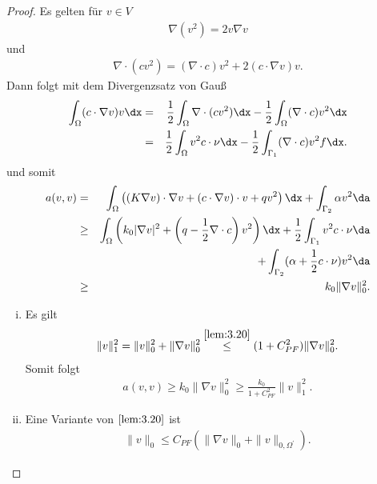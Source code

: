 \begin{proof}
    Es gelten für $v \in V$
    \begin{eqnarray*}
        \nabla(v^2) = 2 v \nabla v
    \end{eqnarray*}
    und
    \begin{eqnarray*}
        \nabla \cdot (c v^2) = (\nabla \cdot c) v^2 + 2 (c \cdot \nabla v) v.
    \end{eqnarray*}
    Dann folgt mit dem Divergenzsatz von Gauß
    \begin{eqnarray*}
            \int_\Omega (c \cdot \nabla v) v \dx
        &=& \frac{1}{2} \int_\Omega \nabla \cdot (c v^2) \dx
            - \frac{1}{2} \int_\Omega (\nabla \cdot c) v^2 \dx \\
        &=& \frac{1}{2} \int_\Omega v^2 c \cdot \nu \dx
            - \frac{1}{2} \int_{\Gamma_1} (\nabla \cdot c) v^2f \dx.
    \end{eqnarray*}
    und somit
    \begin{eqnarray*}
            a(v, v)
        &=& \int_\Omega \left((K \nabla v) \cdot \nabla v
            + (c \cdot \nabla v) \cdot v + q v^2\right) \dx
            + \int_{\Gamma_2} \alpha v^2 \da \\
        &\ge& \int_\Omega \left(k_0 |\nabla v|^2 + \left(q - \frac{1}{2} \nabla
              \cdot c\right) v^2\right) \dx + \frac{1}{2} \int_{\Gamma_1} v^2 c
              \cdot \nu \da \\
              &&+ \int_{\Gamma_2} (\alpha + \frac{1}{2} c \cdot \nu) v^2 \da \\
        &\ge& k_0 \|\nabla v\|_0^2.
    \end{eqnarray*}
    \begin{enumerate}[i)]
      \item
        Es gilt
        \begin{eqnarray*}
              \|v\|_1^2        
            = \|v\|_0^2 + \|\nabla v\|_0^2
            \stackrel{\eqref{lem:3.20}}{\le} (1 + C_{PF}^2) \|\nabla v\|_0^2. 
        \end{eqnarray*}
        Somit folgt
        \begin{eqnarray*}
                a(v, v)
            \ge k_0 \|\nabla v\|_0^2
            \ge \frac{k_0}{1 + C_{PF}^2} \|v\|_1^2.
        \end{eqnarray*}
      \item
        Eine Variante von $\eqref{lem:3.20}$ ist
        \begin{eqnarray*}
            \|v\|_0 \le C_{PF} (\|\nabla v\|_0 + \|v\|_{0,\Omega^\prime}).

\end{eqnarray*}
\end{enumerate}
\end{proof}
